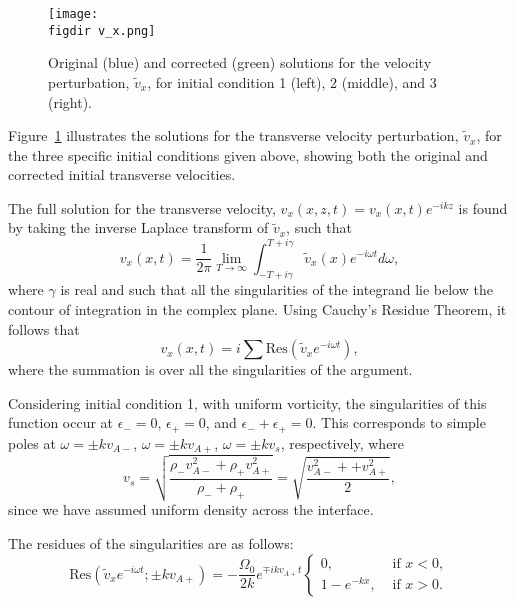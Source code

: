 \documentclass[12pt]{../style-files/ociamthesis}
\begin{document}
\begin{figure}
	\texttt{[image: \\figdir v\_x.png]}
	\caption{Original \cite{rae_etal81} (blue) and corrected (green) solutions for the velocity perturbation, $\tilde{v}_x$, for initial condition 1 (left), 2 (middle), and 3 (right).}
	\label{fig: vx}
\end{figure}

Figure~\ref{fig: vx} illustrates the solutions for the transverse velocity perturbation, $\tilde{v}_x$, for the three specific initial conditions given above, showing both the original and corrected initial transverse velocities.

The full solution for the transverse velocity, $v_x(x, z, t) = v_x(x,t)e^{-ikz}$ is found by taking the inverse Laplace transform of $\tilde{v}_x$, such that
\begin{equation}
v_x(x,t) = \frac{1}{2\pi} \lim_{T \to \infty} \int_{-T+ i\gamma}^{T + i\gamma} \tilde{v}_x(x)e^{-i\omega t} d\omega,
\end{equation}
where $\gamma$ is real and such that all the singularities of the integrand lie below the contour of integration in the complex plane. Using Cauchy's Residue Theorem, it follows that
\begin{equation}
v_x(x, t) = i\sum \mathrm{Res}(\tilde{v}_xe^{-i\omega t}),
\end{equation}
where the summation is over all the singularities of the argument. 

Considering initial condition 1, with uniform vorticity, the singularities of this function occur at $\epsilon_- = 0$, $\epsilon_+ = 0$, and $\epsilon_- + \epsilon_+ = 0$. This corresponds to simple poles at $\omega = \pm kv_{A-}$, $\omega = \pm kv_{A+}$, $\omega = \pm kv_s$, respectively, where
\begin{equation}
v_s = \sqrt{\frac{\rho_-v_{A-}^2 + \rho_+v_{A+}^2}{\rho_- + \rho_+}} = \sqrt{\frac{v_{A-}^2 + +v_{A+}^2}{2}},
\end{equation}
since we have assumed uniform density across the interface.

The residues of the singularities are as follows:
\begin{equation}
\mathrm{Res}(\tilde{v}_x e^{-i\omega t}; \pm kv_{A+}) = -\frac{\Omega_0}{2k} e^{\mp ikv_{A+}t}
\begin{cases}
0, & \text{ if } x<0, \\
1 - e^{-kx}, & \text{ if } x>0.
\end{cases}
\end{equation}
\end{document}
